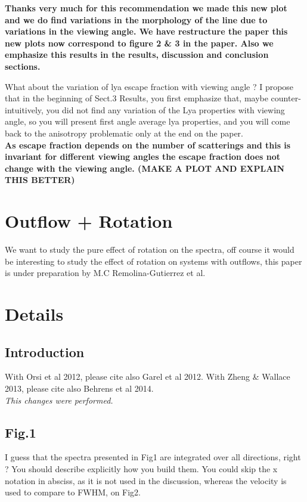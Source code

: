 \documentclass[12pt]{article}
\begin{document}
\textbf{Thanks very much for this recommendation we made this new plot and we do find variations in the morphology of the line due to variations in the viewing angle. We have restructure the paper this new plots now correspond to figure 2 \& 3 in the paper.  Also we emphasize this results in the results, discussion and conclusion sections.\\}

What about the variation of lya escape fraction with viewing angle ? I propose that in the beginning of Sect.3 Results, you first emphasize that, maybe counter-intuitively, you did not find any variation of the Lya properties with viewing angle, so you will present first angle average lya properties, and you will come back to the anisotropy problematic only at the end on the paper.\\

\textbf{As escape fraction depends on the number of scatterings and this is invariant for different viewing angles the escape fraction does not change with the viewing angle. (MAKE A PLOT AND EXPLAIN THIS BETTER)
}


\section*{Outflow + Rotation}

We want to study the pure effect of rotation on the spectra, off course it would
be interesting to study the effect of rotation on systems with outflows, this paper
is under preparation by M.C Remolina-Gutierrez et al.  

\section*{Details}

\subsection*{Introduction}

With Orsi et al 2012, please cite also Garel et al 2012. With Zheng \& Wallace 2013, please cite also Behrens et al 2014.\\

\textit{This changes were performed.}
\subsection*{Fig.1}

I guess that the spectra presented in Fig1 are integrated over all directions, right ? You should describe explicitly how you build them. You could skip the x notation in absciss, as it is not used in the discussion, whereas the velocity is used to compare to FWHM, on Fig2.\\
\end{document}
